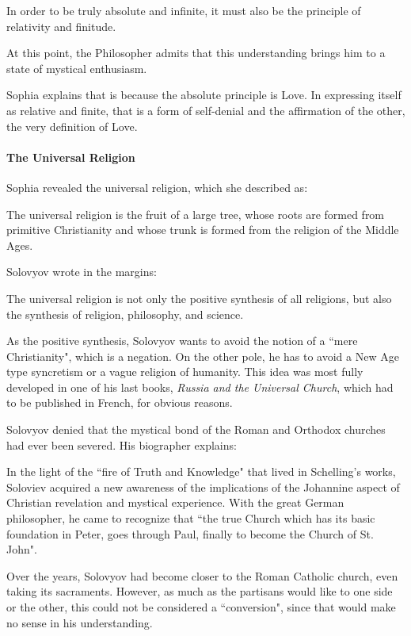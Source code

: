 \begin{quotex}
In order to be truly absolute and infinite, it must also be the principle of relativity and finitude. 

\end{quotex}
At this point, the Philosopher admits that this understanding brings him to a state of mystical enthusiasm.

Sophia explains that is because the absolute principle is Love. In expressing itself as relative and finite, that is a form of self-denial and the affirmation of the other, the very definition of Love.

\paragraph{The Universal Religion}
Sophia revealed the universal religion, which she described as:

\begin{quotex}
The universal religion is the fruit of a large tree, whose roots are formed from primitive Christianity and whose trunk is formed from the religion of the Middle Ages. 

\end{quotex}
Solovyov wrote in the margins:

\begin{quotex}
The universal religion is not only the positive synthesis of all religions, but also the synthesis of religion, philosophy, and science. 

\end{quotex}
As the positive synthesis, Solovyov wants to avoid the notion of a ``mere Christianity", which is a negation. On the other pole, he has to avoid a New Age type syncretism or a vague religion of humanity. This idea was most fully developed in one of his last books, \emph{Russia and the Universal Church}, which had to be published in French, for obvious reasons.

Solovyov denied that the mystical bond of the Roman and Orthodox churches had ever been severed. His biographer explains:

\begin{quotex}
In the light of the ``fire of Truth and Knowledge" that lived in Schelling's works, Soloviev acquired a new awareness of the implications of the Johannine aspect of Christian revelation and mystical experience. With the great German philosopher, he came to recognize that ``the true Church which has its basic foundation in Peter, goes through Paul, finally to become the Church of St. John". 

\end{quotex}
Over the years, Solovyov had become closer to the Roman Catholic church, even taking its sacraments. However, as much as the partisans would like to one side or the other, this could not be considered a ``conversion", since that would make no sense in his understanding.


